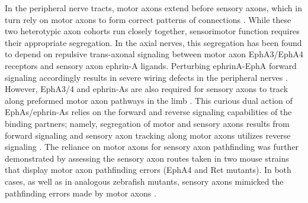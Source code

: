In the peripheral nerve tracts, motor axons extend before sensory axons, which in turn rely on motor axons to form correct patterns of connections \cite{wang2013axons}.
While these two heterotypic axon cohorts run closely together, sensorimotor function requires their appropriate segregation.
In the axial nerves, this segregation has been found to depend on repulsive trans-axonal signaling between motor axon EphA3/EphA4 receptors and sensory axon ephrin-A ligands.
Perturbing ephrinA-EphA forward signaling accordingly results in severe wiring defects in the peripheral nerves \cite{gallarda2008segregation}.
However, EphA3/4 and ephrin-As are also required for sensory axons to track along preformed motor axon pathways in the limb \cite{wang2011anatomical}.
This curious dual action of EphAs/ephrin-As relies on the forward and reverse signaling capabilities of the binding partners; namely, segregation of motor and sensory axons results from forward signaling and sensory axon tracking along motor axons utilizes reverse signaling \cite{wang2011anatomical}.
The reliance on motor axons for sensory axon pathfinding was further demonstrated by assessing the sensory axon routes taken in two mouse strains that display motor axon pathfinding errors (EphA4 and Ret mutants).
In both cases, as well as in analogous zebrafish mutants, sensory axons mimicked the pathfinding errors made by motor axons \cite{wang2014conserved}. 


